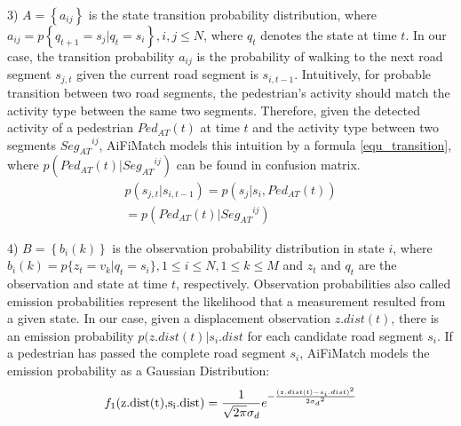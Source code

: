\documentclass[conference]{IEEEtran}
\begin{document}
3) $A = \left\{ {{a_{ij}}} \right\}$ is the state transition probability distribution, where \\ ${a_{ij}} = p\left\{ {{q_{t + 1}} = {s_j}|{q_t} = {s_i}} \right\}, i, j \le N$, where ${q_t}$ denotes the state at time $t$. In our case, the transition probability $a_{ij}$ is the probability of walking to the next road segment $s_{j,t}$ given the current road segment is $s_{i,t-1}$. Intuitively, for probable transition between two road segments, the pedestrian's activity should match the activity type between the same two segments. Therefore, given the detected activity of a pedestrian ${Ped_{AT}}(t)$ at time $t$ and the activity type between two segments ${Seg_{AT}}^{ij}$, AiFiMatch models this intuition by a formula \ref{equ_transition}, where $p({Ped_{AT}}(t)|{Seg_{AT}}^{ij})$ can be found in confusion matrix.
\begin{equation}
\label{equ_transition}
\begin{array}{l}
p({s_{j,t}}|{s_{i,t - 1}}) = p({s_j}|{s_i},Pe{d_{AT}}(t))\\
= p(Pe{d_{AT}}(t)|Se{g_{AT}}^{ij})
\end{array}
\end{equation}

4) $B = \left\{ {{b_i}(k)} \right\}$ is the observation probability distribution in state $i$, where ${b_i}(k) = p\{ {z_t} = {v_k}|{q_t} = {s_i}\},1 \le i \le N,1 \le k \le M$ and $z_t$ and $q_t$ are the observation and state at time $t$, respectively. Observation probabilities also called emission probabilities represent the likelihood that a measurement resulted from a given state. In our case, given a displacement observation $z.dist(t)$, there is an emission probability $p(z.dist(t)|{s_i}.dist$ for each candidate road segment $s_i$. If a pedestrian has passed the complete road segment $s_i$, AiFiMatch models the emission probability as a Gaussian Distribution:
\begin{equation}
\label{equ_emission1}
{f_1}({\rm{z}}{\rm{.dist(t),}}{{\rm{s}}_{\rm{i}}}{\rm{.dist}}) = \frac{1}{{\sqrt {2\pi } {\sigma _d}}}{e^{ - \frac{{{{(z.dist(t) - {s_i}.dist)}^2}}}{{2{\sigma _d}^2}}}}
\end{equation}
\end{document}
